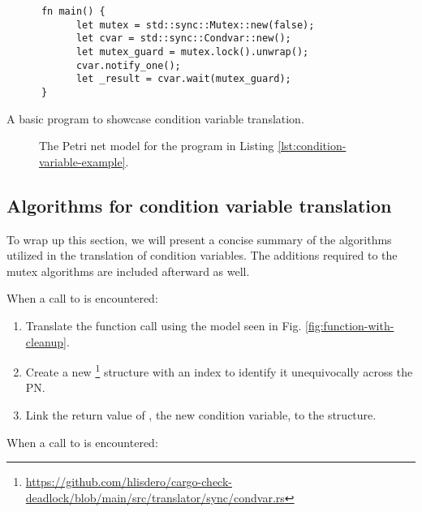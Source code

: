 \begin{listing}[!htbp]
      \begin{verbatim}
      fn main() {
            let mutex = std::sync::Mutex::new(false);
            let cvar = std::sync::Condvar::new();
            let mutex_guard = mutex.lock().unwrap();
            cvar.notify_one();
            let _result = cvar.wait(mutex_guard);
      }     
      \end{verbatim}
      \caption{A basic program to showcase condition variable translation.}
      \label{lst:condition-variable-example}
\end{listing}

\begin{figure}[!htbp]
      \centering
      
      \caption{The Petri net model for the program in Listing \ref{lst:condition-variable-example}.}
      \label{fig:condition-variable-example}
\end{figure}

\subsection{Algorithms for condition variable translation}
\label{sec:condvar-algorithms}

To wrap up this section, we will present a concise summary
of the algorithms utilized in the translation of condition variables.
The additions required to the mutex algorithms are included afterward as well.

When a call to  is encountered:

\begin{enumerate}
      \item Translate the function call using the model seen in Fig. \ref{fig:function-with-cleanup}.
      \item Create a new \footnote{\url{https://github.com/hlisdero/cargo-check-deadlock/blob/main/src/translator/sync/condvar.rs}}
            structure with an index to identify it unequivocally across the \acrshort{PN}.
      \item Link the return value of ,
            the new condition variable, to the  structure.
\end{enumerate}

When a call to  is encountered:

